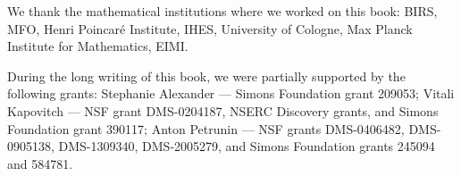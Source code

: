 We thank the mathematical institutions where we worked on this book: 
BIRS, 
MFO,
Henri Poincar\'{e} Institute,
IHES,
University of Cologne, 
Max Planck Institute for Mathematics,
EIMI.


During the long writing of this book, we were partially supported by the following grants:
Stephanie Alexander --- 
Simons Foundation grant 209053;
Vitali Kapovitch ---  NSF grant DMS-0204187, NSERC Discovery grants, and Simons Foundation grant 390117;
Anton Petrunin --- 
NSF grants
DMS-0406482,
DMS-0905138,
DMS-1309340,
DMS-2005279,
and Simons Foundation grants 
245094 and 584781.

